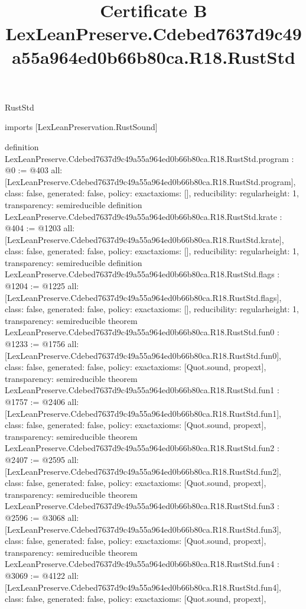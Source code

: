 \begin{lexlean}{RustStd}
\title{Certificate B LexLeanPreserve.Cdebed7637d9c49a55a964ed0b66b80ca.R18.RustStd}
\begin{coremodule}
imports [LexLeanPreservation.RustSound]

definition LexLeanPreserve.Cdebed7637d9c49a55a964ed0b66b80ca.R18.RustStd.program : @0 := @403 {
  all: [LexLeanPreserve.Cdebed7637d9c49a55a964ed0b66b80ca.R18.RustStd.program],
  class: false,
  generated: false,
  policy: exact{axioms: []},
  reducibility: regular{height: 1},
  transparency: semireducible
}
definition LexLeanPreserve.Cdebed7637d9c49a55a964ed0b66b80ca.R18.RustStd.krate : @404 := @1203 {
  all: [LexLeanPreserve.Cdebed7637d9c49a55a964ed0b66b80ca.R18.RustStd.krate],
  class: false,
  generated: false,
  policy: exact{axioms: []},
  reducibility: regular{height: 1},
  transparency: semireducible
}
definition LexLeanPreserve.Cdebed7637d9c49a55a964ed0b66b80ca.R18.RustStd.flags : @1204 := @1225 {
  all: [LexLeanPreserve.Cdebed7637d9c49a55a964ed0b66b80ca.R18.RustStd.flags],
  class: false,
  generated: false,
  policy: exact{axioms: []},
  reducibility: regular{height: 1},
  transparency: semireducible
}
theorem LexLeanPreserve.Cdebed7637d9c49a55a964ed0b66b80ca.R18.RustStd.fun0 : @1233 := @1756 {
  all: [LexLeanPreserve.Cdebed7637d9c49a55a964ed0b66b80ca.R18.RustStd.fun0],
  class: false,
  generated: false,
  policy: exact{axioms: [Quot.sound, propext]},
  transparency: semireducible
}
theorem LexLeanPreserve.Cdebed7637d9c49a55a964ed0b66b80ca.R18.RustStd.fun1 : @1757 := @2406 {
  all: [LexLeanPreserve.Cdebed7637d9c49a55a964ed0b66b80ca.R18.RustStd.fun1],
  class: false,
  generated: false,
  policy: exact{axioms: [Quot.sound, propext]},
  transparency: semireducible
}
theorem LexLeanPreserve.Cdebed7637d9c49a55a964ed0b66b80ca.R18.RustStd.fun2 : @2407 := @2595 {
  all: [LexLeanPreserve.Cdebed7637d9c49a55a964ed0b66b80ca.R18.RustStd.fun2],
  class: false,
  generated: false,
  policy: exact{axioms: [Quot.sound, propext]},
  transparency: semireducible
}
theorem LexLeanPreserve.Cdebed7637d9c49a55a964ed0b66b80ca.R18.RustStd.fun3 : @2596 := @3068 {
  all: [LexLeanPreserve.Cdebed7637d9c49a55a964ed0b66b80ca.R18.RustStd.fun3],
  class: false,
  generated: false,
  policy: exact{axioms: [Quot.sound, propext]},
  transparency: semireducible
}
theorem LexLeanPreserve.Cdebed7637d9c49a55a964ed0b66b80ca.R18.RustStd.fun4 : @3069 := @4122 {
  all: [LexLeanPreserve.Cdebed7637d9c49a55a964ed0b66b80ca.R18.RustStd.fun4],
  class: false,
  generated: false,
  policy: exact{axioms: [Quot.sound, propext]},
}
\end{coremodule}
\end{lexlean}
